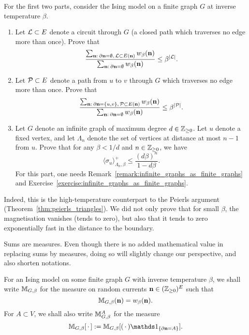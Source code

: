 \begin{exercise}
    For the first two parts, consider
    the Ising model on a finite graph $G$ at inverse temperature $\beta$.
    \begin{enumerate}
        \item Let $\mathcal L\subset E$ denote a circuit through $G$
        (a closed path which traverses no edge more than once).
        Prove that
        \[
            \frac{
                \sum_{\mathbf{n}:\:\partial\mathbf{n}=\emptyset,\,\mathcal L\subset E(\mathbf{n})} w_\beta(\mathbf{n})
            }{
                \sum_{\mathbf{n}:\:\partial\mathbf{n}=\emptyset} w_\beta(\mathbf{n})
            }
            \leq
            \beta^{|\mathcal L|}.
        \]
        \item Let $\mathcal P\subset E$ denote a path from $u$ to $v$ through $G$
        which traverses no edge more than once.
        Prove that
        \[
            \frac{
                \sum_{\mathbf{n}:\:\partial\mathbf{n}=\{u,v\},\,\mathcal P\subset E(\mathbf{n})} w_\beta(\mathbf{n})
            }{
                \sum_{\mathbf{n}:\:\partial\mathbf{n}=\emptyset} w_\beta(\mathbf{n})
            }
            \leq
            \beta^{|\mathcal P|}.
        \]
        \item Let $G$ denote an infinite graph of maximum degree $d\in\mathbb Z_{\geq 0}$.
        Let $u$ denote a fixed vertex, and let $\Lambda_n$ denote the set of vertices
        at distance at most $n-1$ from $u$.
        Prove that for any $\beta<1/d$ and $n\in\mathbb Z_{\geq 0}$, we have
        \[
            \langle\sigma_u\rangle_{\Lambda_n,\beta}^+
            \leq
            \frac{(d\beta)^n}{1-d\beta}.
        \]
        For this part, one needs Remark~\ref{remark:infinite_graphs_as_finite_graphs}
        and Exercise~\ref{exercise:infinite_graphs_as_finite_graphs}.
    \end{enumerate}
    Indeed, this is the high-temperature counterpart to the Peierls argument
    (Theorem~\ref{thm:peierls_triangles}).
    We did not only prove that for small $\beta$, the magnetisation vanishes
    (tends to zero),
    but also that it tends to zero exponentially fast in the distance to the boundary.
\end{exercise}

\begin{definition}
    Sums are measures.
    Even though there is no added mathematical value in replacing sums by measures,
    doing so will slightly change our perspective,
    and also shorten notations.

    For an Ising model on some finite graph $G$ with inverse temperature
    $\beta$, we shall write
    \(
        \mathbb M_{G,\beta}
    \)
    for the measure on random currents $\mathbf{n}\in(\mathbb Z_{\geq 0})^E$
    such that
    \[
        \mathbb M_{G,\beta}(\mathbf{n})=w_\beta(\mathbf{n}).
    \]
    For $A\subset V$, we shall also write $\mathbb M_{G,\beta}^A$
    for the measure
    \[
        \M_{G,\beta}[\blank]:=\M_{G,\beta}[(\blank)\ind{\{\partial\n=A\}}].
    \]
\end{definition}

